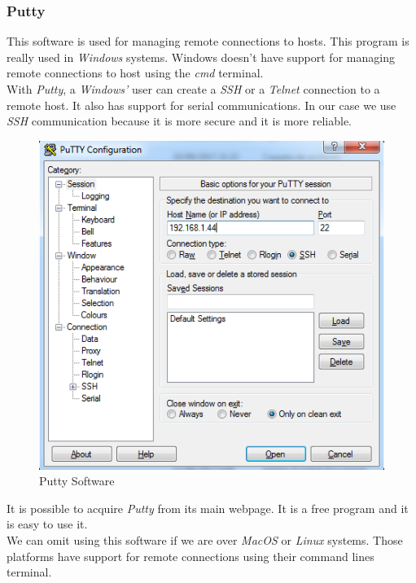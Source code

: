 \subsubsection{Putty}

This software is used for managing remote connections to hosts. This program is really used in \textit{Windows} systems. Windows doesn't have support for managing remote connections to host using the \textit{cmd} terminal.\\

With \textit{Putty}, a \textit{Windows'} user can create a \textit{SSH} or a \textit{Telnet} connection to a remote host. It also has support for serial communications. In our case we use \textit{SSH} communication because it is more secure and it is more reliable.\\

\begin{figure}[H]
\begin{centering}
\includegraphics[scale=0.7]{IMGS/PUTTY.PNG}
\caption{Putty Software \label{PYCHARM}}
\end{centering}
\end{figure}

It is possible to acquire \textit{Putty} from its main webpage. It is a free program and it is easy to use it.\\

We can omit using this software if we are over \textit{MacOS} or \textit{Linux} systems. Those platforms have support for remote connections using their command lines terminal.

\newpage

